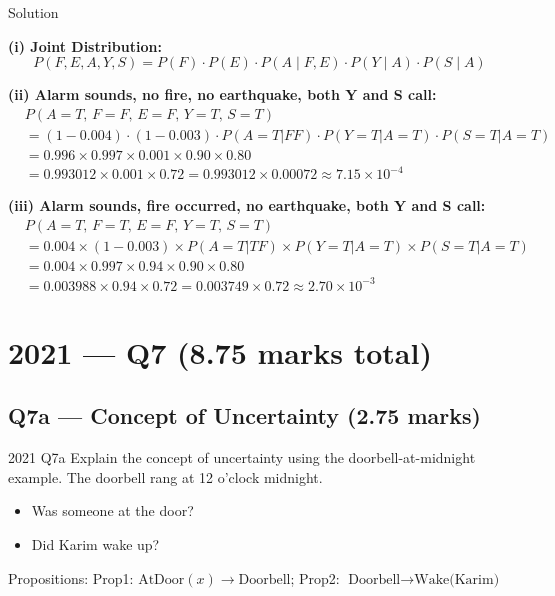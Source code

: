 \documentclass[12pt,a4paper]{article}
\begin{document}
\begin{solbox}{Solution}

\textbf{(i) Joint Distribution:}
\[
P(F,E,A,Y,S) = P(F)\cdot P(E)\cdot P(A \mid F,E)\cdot P(Y \mid A)\cdot P(S \mid A)
\]

\textbf{(ii) Alarm sounds, no fire, no earthquake, both Y and S call:}
\begin{align*}
&P(A{=}T,\,F{=}F,\,E{=}F,\,Y{=}T,\,S{=}T)\\
&= (1-0.004)\cdot(1-0.003)\cdot P(A{=}T|FF)\cdot P(Y{=}T|A{=}T)\cdot P(S{=}T|A{=}T)\\
&= 0.996 \times 0.997 \times 0.001 \times 0.90 \times 0.80\\
&= 0.993012 \times 0.001 \times 0.72 = 0.993012 \times 0.00072 \approx \boxed{7.15 \times 10^{-4}}
\end{align*}

\textbf{(iii) Alarm sounds, fire occurred, no earthquake, both Y and S call:}
\begin{align*}
&P(A{=}T,\,F{=}T,\,E{=}F,\,Y{=}T,\,S{=}T)\\
&= 0.004 \times (1-0.003) \times P(A{=}T|TF) \times P(Y{=}T|A{=}T) \times P(S{=}T|A{=}T)\\
&= 0.004 \times 0.997 \times 0.94 \times 0.90 \times 0.80\\
&= 0.003988 \times 0.94 \times 0.72 = 0.003749 \times 0.72 \approx \boxed{2.70 \times 10^{-3}}
\end{align*}
\end{solbox}

\newpage
\section{2021 --- Q7 (8.75 marks total)}

\subsection{Q7a --- Concept of Uncertainty (2.75 marks)}

\begin{qbox}{2021 Q7a}
Explain the concept of uncertainty using the doorbell-at-midnight example. The doorbell rang at 12 o'clock midnight.
\begin{itemize}[noitemsep]
  \item Was someone at the door?
  \item Did Karim wake up?
\end{itemize}
Propositions: Prop1: $\text{AtDoor}(x) \to \text{Doorbell}$; \quad Prop2: $\text{Doorbell} \to \text{Wake(Karim)}$
\end{qbox}
\end{document}
